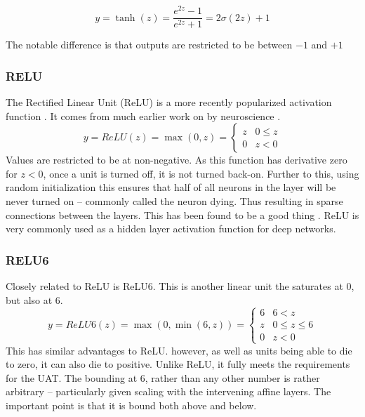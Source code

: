 \documentclass[12pt,parskip]{komatufte}
\begin{document}
\begin{equation}
y=\tanh(z)=\frac{e^{2z}-1}{e^{2z}+1}=2\sigma(2z)+1
\end{equation}

The notable difference is that outputs are restricted to be between $-1$ and $+1$

\subsubsection{RELU}
The Rectified Linear Unit (ReLU) is a more recently popularized activation function .
It comes from much earlier work on by neuroscience .
\begin{equation}
y=ReLU(z)=\max \left( 0, z \right)=\begin{cases}
z & 0\le z\\
0 & z<0
\end{cases}
\end{equation}
Values are restricted to be at non-negative.
As this function has derivative zero for $z<0$, once a unit is turned off, it is not turned back-on.
Further to this, using random initialization this ensures that half of all neurons in the layer will be never turned on -- commonly called the neuron dying.
Thus resulting in sparse connections between the layers.
This has been found to be a good thing .
ReLU is very commonly used as a hidden layer activation function for deep networks.



\subsubsection{RELU6}

Closely related to ReLU is ReLU6.
This is another linear unit the saturates at 0, but also at 6.
\begin{equation}
y=ReLU6(z)=\max \left(0, \min\left(6, z\right) \right) =  \begin{cases}
6 & 6<z\\
z & 0\le z\le6\\
0 & z<0
\end{cases}
\end{equation}
This has similar advantages to ReLU.
however, as well as units being able to die to zero, it can also die to positive.
Unlike ReLU, it fully meets the requirements for the UAT.
The bounding at 6, rather than any other number is rather arbitrary -- particularly given scaling with the intervening affine layers.
The important point is that it is bound both above and below.
\end{document}
